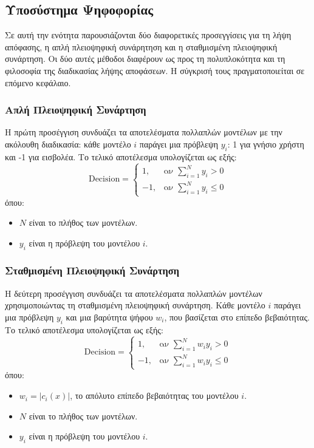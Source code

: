 \subsection{Υποσύστημα Ψηφοφορίας}
Σε αυτή την ενότητα παρουσιάζονται δύο διαφορετικές προσεγγίσεις για τη λήψη απόφασης, η απλή πλειοψηφική συνάρητηση και η σταθμισμένη πλειοψηφική συνάρτηση. Οι δύο αυτές μέθοδοι διαφέρουν ως προς τη πολυπλοκότητα και τη φιλοσοφία της διαδικασίας λήψης αποφάσεων. Η σύγκρισή τους πραγματοποιείται σε επόμενο κεφάλαιο.

\subsubsection{Απλή Πλειοψηφική Συνάρτηση}
Η πρώτη προσέγγιση συνδυάζει τα αποτελέσματα πολλαπλών μοντέλων με την ακόλουθη διαδικασία: κάθε μοντέλο $i$ παράγει μια πρόβλεψη $y_i$: 1 για γνήσιο χρήστη και -1 για εισβολέα. Το τελικό αποτέλεσμα υπολογίζεται ως εξής:
\begin{equation}
    \text{Decision} =
    \begin{cases} 
    1, & \text{αν } \sum_{i=1}^{N} y_i > 0 \\
    -1, & \text{αν } \sum_{i=1}^{N} y_i \leq 0
    \end{cases}
\end{equation}
όπου:
\begin{itemize}
    \item $N$ είναι το πλήθος των μοντέλων.
    \item $y_i$ είναι η πρόβλεψη του μοντέλου $i$.
\end{itemize}

\subsubsection{Σταθμισμένη Πλειοψηφική Συνάρτηση}
Η δεύτερη προσέγγιση συνδυάζει τα αποτελέσματα πολλαπλών μοντέλων χρησιμοποιώντας τη σταθμισμένη πλειοψηφική συνάρτηση. Κάθε μοντέλο $i$ παράγει μια πρόβλεψη $y_i$ και μια βαρύτητα ψήφου $w_i$, που βασίζεται στο επίπεδο βεβαιότητας. Το τελικό αποτέλεσμα υπολογίζεται ως εξής:
\begin{equation}
    \text{Decision} =
    \begin{cases} 
    1, & \text{αν } \sum_{i=1}^{N} w_i y_i > 0 \\
    -1, & \text{αν } \sum_{i=1}^{N} w_i y_i \leq 0
    \end{cases}
\end{equation}
όπου:
\begin{itemize}
    \item $w_i = |c_i(x)|$, το απόλυτο επίπεδο βεβαιότητας του μοντέλου $i$.
    \item $N$ είναι το πλήθος των μοντέλων.
    \item $y_i$ είναι η πρόβλεψη του μοντέλου $i$.
\end{itemize}

